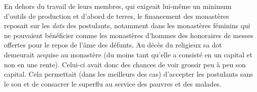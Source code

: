  En dehors du travail de leurs membres, qui exigeait lui-même un minimum d'outils de production et d'abord de terres, le financement des monastères reposait sur les \emph{dots} des postulants, notamment dans les monastères féminins qui ne pouvaient bénéficier comme les monastères d'hommes des honoraires de messes offertes pour le repos de l'âme des défunts. Au décès du religieux sa dot demeurait acquise au monastère (du moins tant qu'elle a consisté en un capital et non en une rente). Celui-ci avait donc des chances de voir grossir peu à peu son capital. Cela permettait (dans les meilleurs des cas) d'accepter les postulants sans le sou et de consacrer le superflu au service des pauvres et des malades.
 
 
 